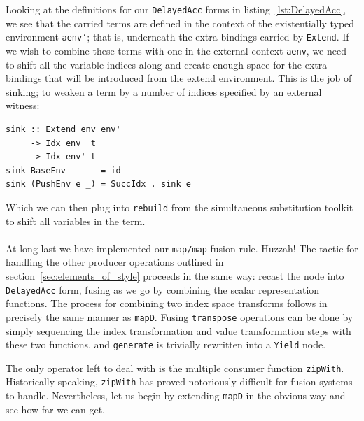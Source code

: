 Looking at the definitions for our \texttt{DelayedAcc} forms in
listing~\ref{lst:DelayedAcc}, we see that the carried terms are defined in the
context of the existentially typed environment \texttt{aenv'}; that is,
underneath the extra bindings carried by \texttt{Extend}. If we wish to combine
these terms with one in the external context \texttt{aenv}, we need to shift all
the variable indices along and create enough space for the extra bindings that
will be introduced from the extend environment. This is the job of sinking; to
weaken a term by a number of indices specified by an external witness:
%
\begin{lstlisting}[style=haskell]
sink :: Extend env env'
     -> Idx env  t
     -> Idx env' t
sink BaseEnv       = id
sink (PushEnv e _) = SuccIdx . sink e
\end{lstlisting}
%
Which we can then plug into \texttt{rebuild} from the simultaneous substitution
toolkit to shift all variables in the term.
%


\paragraph{}

At long last we have implemented our \texttt{map/map} fusion rule. Huzzah! The
tactic for handling the other producer operations outlined in
section~\ref{sec:elements_of_style} proceeds in the same way: recast the node
into \texttt{DelayedAcc} form, fusing as we go by combining the scalar
representation functions. The process for combining two index space transforms
follows in precisely the same manner as \texttt{mapD}. Fusing \texttt{transpose}
operations can be done by simply sequencing the index transformation and value
transformation steps with these two functions, and \texttt{generate} is
trivially rewritten into a \texttt{Yield} node.

The only operator left to deal with is the multiple consumer function
\texttt{zipWith}. Historically speaking, \texttt{zipWith} has proved notoriously
difficult for fusion systems to handle. Nevertheless, let us begin by extending
\texttt{mapD} in the obvious way and see how far we can get.


